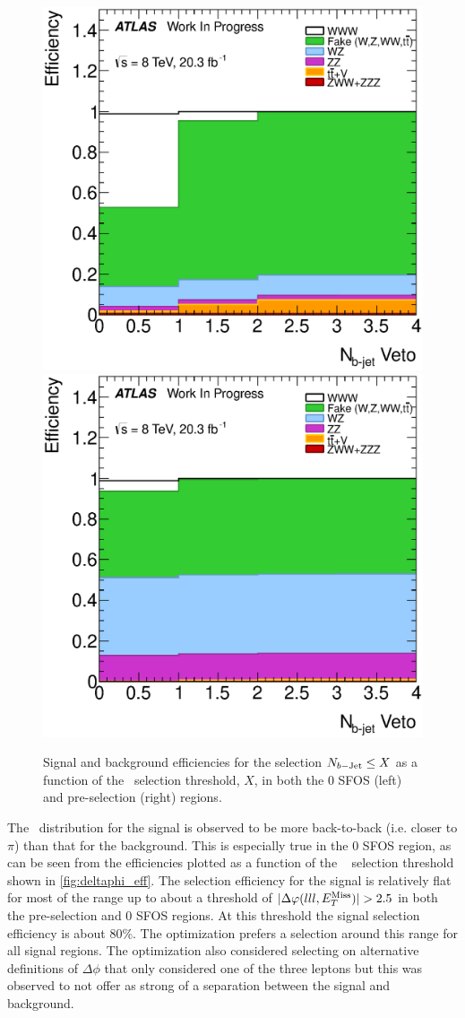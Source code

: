 \begin{figure}[ht!]
\centering
\includegraphics[width=0.45\columnwidth]{figures/optimization/SignalRegionsPreselection_0SFOS_Efficiencies/NBTaggedJets_LeftCumulative.eps}
\includegraphics[width=0.45\columnwidth]{figures/optimization/SignalRegions_0p5mmZ0_Preselection_Efficiencies/NBTaggedJets_LeftCumulative.eps}
\caption{ Signal and background efficiencies 
for the selection
$N_{b-\textrm{Jet}} \leq X$
as a function of the \nbjet~selection
threshold, $X$, in both the 0 SFOS (left) and pre-selection (right) regions.  }
\label{fig:nbjet_eff}
\end{figure}


The \deltaphi~distribution for the signal is observed to be more back-to-back
(i.e. closer to $\pi$)
than that for the background. This is especially true in the 0 SFOS
region, as can be seen from the efficiencies plotted 
as a function of the \deltaphi~
selection threshold shown in \fig\ref{fig:deltaphi_eff}.
The selection efficiency for the signal is relatively flat for
most of the range up to about 
a threshold of $|\deltaphi|>2.5$ in both the pre-selection and 0 SFOS
regions.  At this threshold the signal selection efficiency 
is about 80\%.  The optimization prefers a selection
around this range for all signal regions.
The optimization also considered selecting on alternative
definitions of $\Delta\phi$ that only considered one of the three
leptons but this was observed to not offer as strong of a separation
between the signal and background. %

